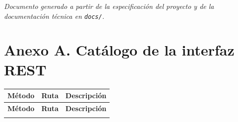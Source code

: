 \documentclass[doc,12pt,a4paper]{apa7}
\begin{document}
\vspace{1.5cm}
\begin{center}
\textit{Documento generado a partir de la especificación del proyecto y de la documentación técnica en \texttt{docs/}.}
\end{center}

\clearpage
\section*{Anexo A. Catálogo de la interfaz REST}

\small
\begin{longtable}{|P{1.8cm}|P{6.4cm}|L{6.4cm}|}
\hline
\textbf{Método} & \textbf{Ruta} & \textbf{Descripción} \\ \hline
\endfirsthead
\hline
\textbf{Método} & \textbf{Ruta} & \textbf{Descripción} \\ \hline
\endhead
\hline
\endfoot


\end{longtable}
\end{document}
